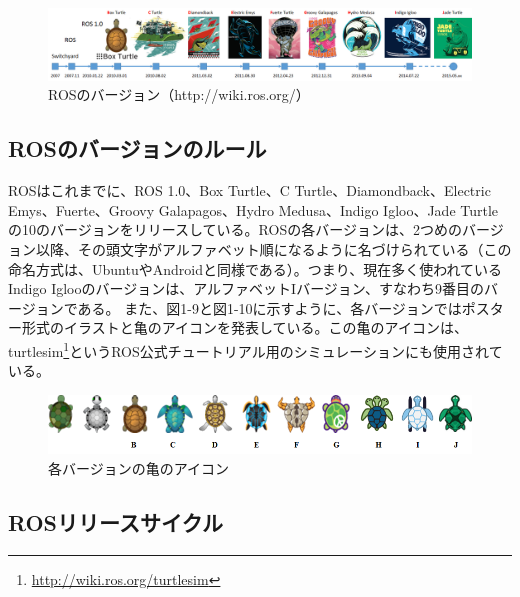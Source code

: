 {{\begin{figure}[h]
  \centering
  \includegraphics[width=\columnwidth]{pictures/chapter1/pic_01_05.png}
  \caption{ROSのバージョン（http://wiki.ros.org/）}
\end{figure}

\subsection{ROSのバージョンのルール}

ROSはこれまでに、ROS 1.0、Box Turtle、C Turtle、Diamondback、Electric Emys、Fuerte、Groovy Galapagos、Hydro Medusa、Indigo Igloo、Jade Turtleの10のバージョンをリリースしている。ROSの各バージョンは、2つめのバージョン以降、その頭文字がアルファベット順になるように名づけられている（この命名方式は、UbuntuやAndroidと同様である）。つまり、現在多く使われているIndigo Iglooのバージョンは、アルファベットIバージョン、すなわち9番目のバージョンである。
また、図1-9と図1-10に示すように、各バージョンではポスター形式のイラストと亀のアイコンを発表している。この亀のアイコンは、turtlesim\footnote{\url{http://wiki.ros.org/turtlesim}}というROS公式チュートリアル用のシミュレーションにも使用されている。

\begin{figure}[h]
  \centering
  \includegraphics[width=\columnwidth]{pictures/chapter1/pic_01_06.png}
  \caption{各バージョンの亀のアイコン}
\end{figure}

\subsection{ROSリリースサイクル}

}}
